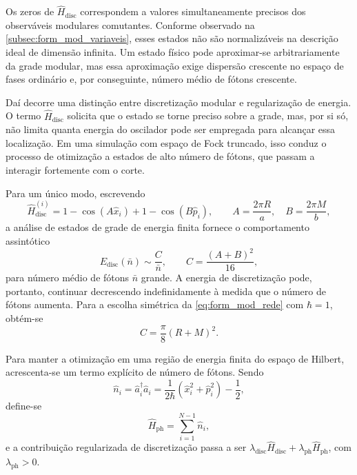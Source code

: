         Os zeros de $\hat{H}_{\text{disc}}$ correspondem a valores simultaneamente precisos dos observáveis modulares comutantes. Conforme observado na \autoref{subsec:form_mod_variaveis}, esses estados não são normalizáveis na descrição ideal de dimensão infinita. Um estado físico pode aproximar-se arbitrariamente da grade modular, mas essa aproximação exige dispersão crescente no espaço de fases ordinário e, por conseguinte, número médio de fótons crescente.

        Daí decorre uma distinção entre discretização modular e regularização de energia. O termo $\hat{H}_{\text{disc}}$ solicita que o estado se torne preciso sobre a grade, mas, por si só, não limita quanta energia do oscilador pode ser empregada para alcançar essa localização. Em uma simulação com espaço de Fock truncado, isso conduz o processo de otimização a estados de alto número de fótons, que passam a interagir fortemente com o corte.

        Para um único modo, escrevendo
        \begin{equation}\label{eq:form_mod_hdisc_mode}
            \hat{H}^{(i)}_{\text{disc}} = 1 - \cos\!\left( A \hat{x}_i \right)
            + 1 - \cos\!\left( B \hat{p}_i \right) ,
            \qquad A = \frac{2\pi R}{a} , \quad B = \frac{2\pi M}{b} ,
        \end{equation}
        \noindent a análise de estados de grade de energia finita fornece o comportamento assintótico
        \begin{equation}\label{eq:form_mod_assintotico}
            E_{\text{disc}}(\bar{n}) \sim \frac{C}{\bar{n}} ,
            \qquad C = \frac{(A+B)^2}{16} ,
        \end{equation}
        \noindent para número médio de fótons $\bar{n}$ grande. A energia de discretização pode, portanto, continuar decrescendo indefinidamente à medida que o número de fótons aumenta. Para a escolha simétrica da \autoref{eq:form_mod_rede} com $\hbar = 1$, obtém-se
        \begin{equation}\label{eq:form_mod_C}
            C = \frac{\pi}{8} (R + M)^2 .
        \end{equation}

        Para manter a otimização em uma região de energia finita do espaço de Hilbert, acrescenta-se um termo explícito de número de fótons. Sendo
        \begin{equation}\label{eq:form_mod_nph}
            \hat{n}_i = \hat{a}_i^{\dagger} \hat{a}_i
            = \frac{1}{2\hbar} \left( \hat{x}_i^2 + \hat{p}_i^2 \right) - \frac{1}{2} ,
        \end{equation}
        \noindent define-se
        \begin{equation}\label{eq:form_mod_hph}
            \hat{H}_{\text{ph}} = \sum_{i=1}^{N-1} \hat{n}_i ,
        \end{equation}
        \noindent e a contribuição regularizada de discretização passa a ser $\lambda_{\text{disc}} \hat{H}_{\text{disc}} + \lambda_{\text{ph}} \hat{H}_{\text{ph}}$, com $\lambda_{\text{ph}} > 0$.

